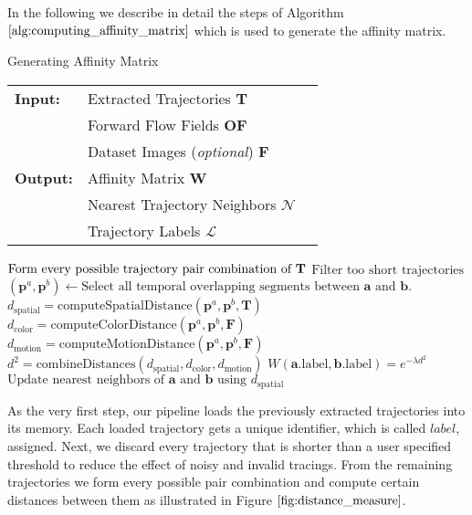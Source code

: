 In the following we describe in detail the steps of Algorithm $\ref{alg:computing_affinity_matrix}$ which is used to generate the affinity matrix.
\begin{algorithm}[H]
\caption{Generating Affinity Matrix}
\begin{table}[H]
  \begin{tabular}{@{}lll@{}}
    \textbf{Input:} & Extracted Trajectories \bf{T} \\
		& Forward Flow Fields \bf{OF} \\
 		& Dataset Images (\emph{optional}) \bf{F} \\
    \textbf{Output:} & Affinity Matrix \bf{W} \\
    & Nearest Trajectory Neighbors \bf{$\mathcal{N}$}\\
    & Trajectory Labels \bf{$\mathcal{L}$}\\
  \end{tabular} 
\end{table}
\setlength{\fboxrule}{0pt} 
\begin{boxedminipage}{1.0\textwidth}
  \begin{algorithmic}[1]
      \State $\text{Form every possible trajectory pair combination of } \bf{T}$
      \State $\text{Filter too short trajectories}$
        \State $\left( \textbf{p}^a, \textbf{p}^b \right) \longleftarrow\text{Select all temporal overlapping segments between } \textbf{a} \text{ and } \textbf{b}.$
        \State $d_{\text{spatial}} = \text{computeSpatialDistance}\left( \textbf{p}^a, \textbf{p}^b, \textbf{T} \right)$
        \State $d_{\text{color}} = \text{computeColorDistance}\left( \textbf{p}^a, \textbf{p}^b, \textbf{F} \right)$
        \State $d_{\text{motion}} = \text{computeMotionDistance}\left( \textbf{p}^a, \textbf{p}^b, \textbf{F} \right)$
        \State $d^2 = \text{combineDistances} \left( d_{\text{spatial}}, d_{\text{color}}, d_{\text{motion}} \right)$
        \State $W \left( \textbf{a}\text{.label}, \textbf{b}\text{.label} \right) = e^{-\lambda d^2}$
        \State $\text{Update nearest neighbors of } \textbf{a} \text{ and } \textbf{b} \text{ using } d_{\text{spatial}}$
      \EndFor
  \end{algorithmic}
  \end{boxedminipage}
  \vskip1.5pt
\label{alg:computing_affinity_matrix}
\end{algorithm}
As the very first step, our pipeline loads the previously extracted trajectories into its memory. Each loaded trajectory gets a unique identifier, which is called $\textit{label}$, assigned. Next, we discard every trajectory that is shorter than a user specified threshold to reduce the effect of noisy and invalid tracings. From the remaining trajectories we form every possible pair combination and compute certain distances between them as illustrated in Figure $\ref{fig:distance_measure}$.
